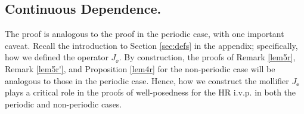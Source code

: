 \subsection{Continuous Dependence.} The proof is analogous to the proof in
the periodic case, with one important caveat. Recall the introduction to Section
\ref{sec:defs} in the appendix; specifically, how we defined the operator
$J_\ee$. By construction, the proofs of Remark \ref{lem5r}, Remark
\ref{lem5r'}, and Proposition \ref{lem4r} for the non-periodic case will be
analogous to those in the periodic case. Hence, how we
construct the mollifier $J_\ee$ plays a critical role in the proofs of
well-posedness for the HR i.v.p. in both the periodic and non-periodic cases. %
%
